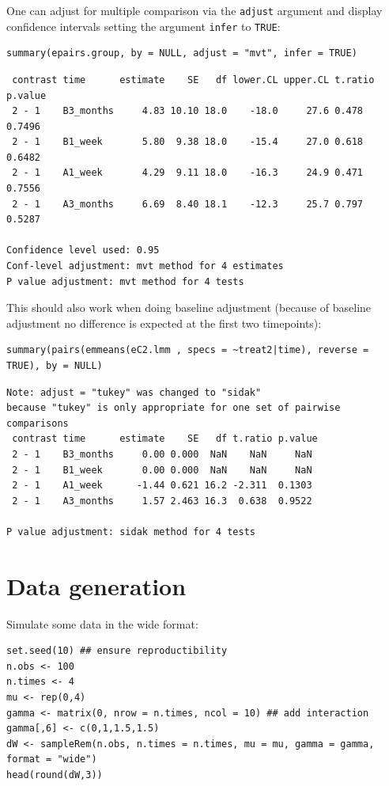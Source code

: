 \documentclass[12pt]{article}
\begin{document}
One can adjust for multiple comparison via the \texttt{adjust} argument and
display confidence intervals setting the argument \texttt{infer} to \texttt{TRUE}:
\lstset{language=r,label= ,caption= ,captionpos=b,numbers=none}
\begin{lstlisting}
summary(epairs.group, by = NULL, adjust = "mvt", infer = TRUE)
\end{lstlisting}

\begin{verbatim}
 contrast time      estimate    SE   df lower.CL upper.CL t.ratio p.value
 2 - 1    B3_months     4.83 10.10 18.0    -18.0     27.6 0.478   0.7496 
 2 - 1    B1_week       5.80  9.38 18.0    -15.4     27.0 0.618   0.6482 
 2 - 1    A1_week       4.29  9.11 18.0    -16.3     24.9 0.471   0.7556 
 2 - 1    A3_months     6.69  8.40 18.1    -12.3     25.7 0.797   0.5287 

Confidence level used: 0.95 
Conf-level adjustment: mvt method for 4 estimates 
P value adjustment: mvt method for 4 tests
\end{verbatim}


This should also work when doing baseline adjustment (because of
baseline adjustment no difference is expected at the first two
timepoints):
\lstset{language=r,label= ,caption= ,captionpos=b,numbers=none}
\begin{lstlisting}
summary(pairs(emmeans(eC2.lmm , specs = ~treat2|time), reverse = TRUE), by = NULL)
\end{lstlisting}

\begin{verbatim}
Note: adjust = "tukey" was changed to "sidak"
because "tukey" is only appropriate for one set of pairwise comparisons
 contrast time      estimate    SE   df t.ratio p.value
 2 - 1    B3_months     0.00 0.000  NaN    NaN     NaN 
 2 - 1    B1_week       0.00 0.000  NaN    NaN     NaN 
 2 - 1    A1_week      -1.44 0.621 16.2 -2.311  0.1303 
 2 - 1    A3_months     1.57 2.463 16.3  0.638  0.9522 

P value adjustment: sidak method for 4 tests
\end{verbatim}


\clearpage

\section{Data generation}
\label{sec:org0d18e1d}
Simulate some data in the wide format:
\lstset{language=r,label= ,caption= ,captionpos=b,numbers=none}
\begin{lstlisting}
set.seed(10) ## ensure reproductibility
n.obs <- 100
n.times <- 4
mu <- rep(0,4)
gamma <- matrix(0, nrow = n.times, ncol = 10) ## add interaction
gamma[,6] <- c(0,1,1.5,1.5)
dW <- sampleRem(n.obs, n.times = n.times, mu = mu, gamma = gamma, format = "wide")
head(round(dW,3))
\end{lstlisting}
\end{document}
